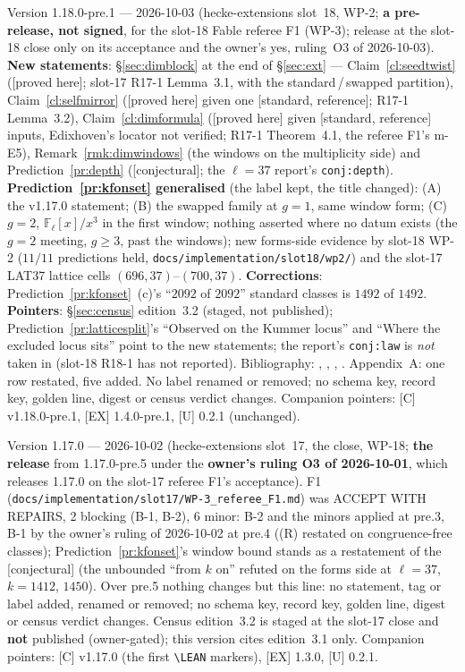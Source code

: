 \documentclass[11pt]{article}
\theoremstyle{remark}
\newcommand{\F}{\mathbb{F}}
\newcommand{\Fl}{\F_\ell}
\newcommand{\PROVED}{\textsf{[proved here]}}
\newcommand{\STD}{\textsf{[standard, reference]}}
\newcommand{\CONJ}{\textsf{[conjectural]}}
\begin{document}
Version 1.18.0-pre.1 --- 2026-10-03 (hecke-extensions slot~18, WP-2; \textbf{a pre-release, not signed}, for the slot-18 Fable referee F1 (WP-3);
release at the slot-18 close only on its acceptance and the owner's yes, ruling~O3 of 2026-10-03). \textbf{New statements}: \S\ref{sec:dimblock} at the end of
\S\ref{sec:ext} --- Claim~\ref{cl:seedtwist} (\PROVED; slot-17 R17-1 Lemma~3.1, with the standard\,/\,swapped partition), Claim~\ref{cl:selfmirror} (\PROVED{}
given one \STD; R17-1 Lemma~3.2), Claim~\ref{cl:dimformula} (\PROVED{} given \STD{} inputs, Edixhoven's locator not verified; R17-1 Theorem~4.1, the referee
F1's m-E5), Remark~\ref{rmk:dimwindows} (the windows on the multiplicity side) and Prediction~\ref{pr:depth} (\CONJ; the $\ell=37$ report's \texttt{conj:depth}).
\textbf{Prediction~\ref{pr:kfonset} generalised} (the label kept, the title changed): (A) the v1.17.0 statement; (B) the swapped family at $g=1$, same window
form; (C) $g=2$, $\Fl[x]/x^{3}$ in the first window; nothing asserted where no datum exists (the $g=2$ meeting, $g\ge3$, past the windows); new forms-side
evidence by slot-18 WP-2 ($11/11$ predictions held, \texttt{docs/implementation/slot18/wp2/}) and the slot-17 LAT37 lattice cells $(696,37)$--$(700,37)$.
\textbf{Corrections}: Prediction~\ref{pr:kfonset}~(c)'s ``$2092$ of $2092$'' standard classes is $1492$ of $1492$. \textbf{Pointers}: \S\ref{sec:census}
edition~3.2 (staged, not published); Prediction~\ref{pr:latticesplit}'s ``Observed on the Kummer locus'' and ``Where the excluded locus sits'' point to the new
statements; the report's \texttt{conj:law} is \emph{not} taken in (slot-18 R18-1 has not reported). Bibliography: \cite{diamond_im}, \cite{edixhoven},
\cite{washington1st}, \cite{wiles_ordinary}. Appendix~A: one row restated, five added. No label renamed or removed; no schema key, record key, golden line,
digest or census verdict changes. Companion pointers: [C] v1.18.0-pre.1, [EX] 1.4.0-pre.1, [U] 0.2.1 (unchanged).

Version 1.17.0 --- 2026-10-02 (hecke-extensions slot~17, the close, WP-18; \textbf{the release} from 1.17.0-pre.5 under the \textbf{owner's
ruling O3 of 2026-10-01}, which releases 1.17.0 on the slot-17 referee F1's acceptance). F1 (\texttt{docs/implementation/slot17/WP-3\_referee\_F1.md}) was
ACCEPT WITH REPAIRS, 2 blocking (B-1, B-2), 6 minor: B-2 and the minors applied at pre.3, B-1 by the owner's ruling of 2026-10-02 at pre.4 ((R) restated on
congruence-free classes); Prediction~\ref{pr:kfonset}'s window bound stands as a restatement of the \CONJ{} (the unbounded ``from $k$ on'' refuted on the forms side
at $\ell=37$, $k=1412$, $1450$). Over pre.5 nothing changes but this line: no statement, tag or label added, renamed or removed; no schema key, record key, golden
line, digest or census verdict changes. Census edition~3.2 is staged at the slot-17 close and \textbf{not} published (owner-gated); this version cites
edition~3.1 only. Companion pointers: [C] v1.17.0 (the first \texttt{\textbackslash LEAN} markers), [EX] 1.3.0, [U] 0.2.1.
\end{document}
